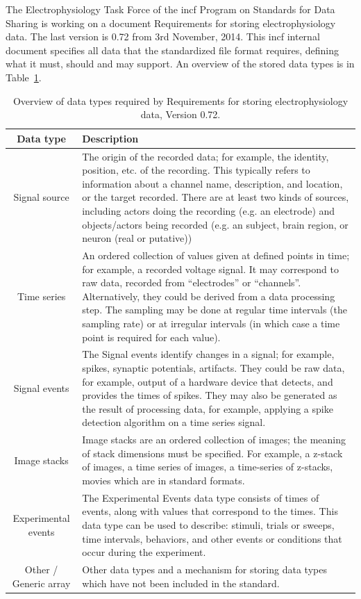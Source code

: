 The Electrophysiology Task Force of the \gls{incf} Program on Standards for Data Sharing is working on a document Requirements for storing electrophysiology data. The last version is 0.72 from 3rd November, 2014. This \gls{incf} internal document specifies all data that the standardized file format requires, defining what it must, should and may support. An overview of the stored data types is in Table~\ref{data_types}. \cite{requirements}
\begin{table}
	\begin{center}
		\begin{tabular}{|c|p{9cm}|}
			\hline Data type  & Description \\ 
			\hline Signal source & The origin of the recorded data; for example, the identity, position, etc. of the recording. This typically refers to information about a channel name, description, and location, or the target recorded.  There are at least two kinds of sources, including actors doing the recording (e.g. an electrode) and objects/actors being recorded (e.g. an subject, brain region, or neuron (real or putative))   \\ 
			\hline  Time series & An ordered collection of values given at defined points in time; for example, a recorded voltage  signal. It may correspond to raw data, recorded from “electrodes” or “channels”.   Alternatively, they could be derived from a data processing step.  The sampling may be done at regular time intervals (the sampling rate) or at irregular intervals (in which case a time point is required for each value).   \\ 
			\hline Signal events & The Signal events identify changes in a signal; for example, spikes, synaptic potentials, artifacts.  They could be raw data, for example, output of a hardware device that detects, and provides the times of spikes. They may also be generated as the result of processing data, for example, applying a spike detection algorithm on a time series signal. \\ 
			\hline  Image stacks & Image stacks are an ordered collection of images; the meaning of stack dimensions must be specified.  For example, a z-stack of images, a time series of images, a time-series of z-stacks, movies which are in standard formats.   \\ 
			\hline Experimental events & The Experimental Events data type consists of times of events, along with values that correspond to the times.   This data type can be used to describe: stimuli, trials or sweeps, time intervals, behaviors, and other events or conditions that occur during the experiment.   \\ 
			\hline Other / Generic array & Other data types and a mechanism for storing data types which have not been included in the standard. \\ 
			\hline 
		\end{tabular} 
		
		\caption{Overview of data types required by Requirements for storing electrophysiology data, Version 0.72. \cite{requirements}}
		\label{data_types}
	\end{center}
\end{table}






